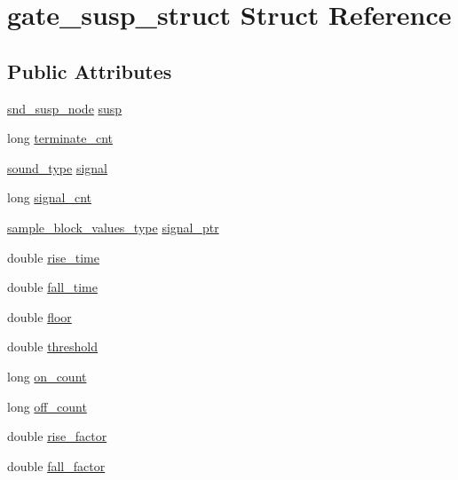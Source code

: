 \hypertarget{structgate__susp__struct}{}\section{gate\+\_\+susp\+\_\+struct Struct Reference}
\label{structgate__susp__struct}
\subsection*{Public Attributes}
\begin{DoxyCompactItemize}
\item 
\hyperlink{sound_8h_a6b268203688a934bd798ceb55f85d4c0}{snd\+\_\+susp\+\_\+node} \hyperlink{structgate__susp__struct_a087d567afc9b82bb15f3fe848468bf59}{susp}
\item 
long \hyperlink{structgate__susp__struct_ab9f69aa46331e3ce63c92ffeb43e794c}{terminate\+\_\+cnt}
\item 
\hyperlink{sound_8h_a792cec4ed9d6d636d342d9365ba265ea}{sound\+\_\+type} \hyperlink{structgate__susp__struct_a0e66646afc1fff07b6619f745c6ef3e7}{signal}
\item 
long \hyperlink{structgate__susp__struct_a1a56be66b6c7439f80d39309852551a4}{signal\+\_\+cnt}
\item 
\hyperlink{sound_8h_a83d17f7b465d1591f27cd28fc5eb8a03}{sample\+\_\+block\+\_\+values\+\_\+type} \hyperlink{structgate__susp__struct_a736d226f6b4bcb7c42a68dbfb5d40706}{signal\+\_\+ptr}
\item 
double \hyperlink{structgate__susp__struct_aa9e1c70d43bd2132c957bf4539b56e15}{rise\+\_\+time}
\item 
double \hyperlink{structgate__susp__struct_a587d7890f2c0427ba46362046a7be2f8}{fall\+\_\+time}
\item 
double \hyperlink{structgate__susp__struct_ab57cbc8b034c3b7bf3685b715a3f597e}{floor}
\item 
double \hyperlink{structgate__susp__struct_a82e9c68e2ff25e46fe7ee33d8bf3b2d9}{threshold}
\item 
long \hyperlink{structgate__susp__struct_a03e2eda77d26844d83c52d272d4f09ec}{on\+\_\+count}
\item 
long \hyperlink{structgate__susp__struct_a3be53d80c51a5e9758681a90f2b764b8}{off\+\_\+count}
\item 
double \hyperlink{structgate__susp__struct_af7ee75e5c345f59b7414578f5760102c}{rise\+\_\+factor}
\item 
double \hyperlink{structgate__susp__struct_a8aa9e42c9a866827d190740d6e5ca029}{fall\+\_\+factor}

\end{DoxyCompactItemize}
